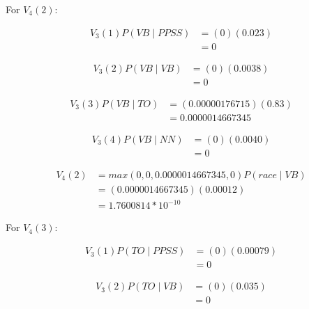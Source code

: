 \documentclass[10pt,a4paper]{article}
\begin{document}
For $V_4(2):$

\begin{equation}
\begin{split}
V_3(1)P(VB\mid PPSS) &= (0)(0.023) \\
&= 0
\end{split}
\end{equation}

\begin{equation}
\begin{split}
V_3(2)P(VB\mid VB) &= (0)(0.0038) \\
 &= 0
\end{split}
\end{equation}

\begin{equation}
\begin{split}
V_3(3)P(VB\mid TO) &= (0.00000176715)(0.83) \\
&= 0.0000014667345
\end{split}
\end{equation}

\begin{equation}
\begin{split}
V_3(4)P(VB\mid NN) &= (0)(0.0040) \\
 &= 0
\end{split}
\end{equation}

\begin{equation}
\begin{split}
V_4(2) &= max(0,0,0.0000014667345,0)P(race\mid VB) \\
 &=(0.0000014667345)(0.00012) \\
 &=1.7600814*10^{-10}
\end{split}
\end{equation}


For $V_4(3):$

\begin{equation}
\begin{split}
V_3(1)P(TO\mid PPSS) &= (0)(0.00079) \\
&= 0
\end{split}
\end{equation}

\begin{equation}
\begin{split}
V_3(2)P(TO\mid VB) &= (0)(0.035) \\
 &= 0
\end{split}
\end{equation}
\end{document}
